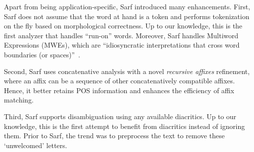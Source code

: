\documentclass[11pt]{article}
\newcommand{\noVocRL}[1]{\transtrue\novocalize\RL{#1}\vocalize}
\begin{document}
Apart from being application-specific, 
Sarf %
introduced 
many enhancements. %
First,
Sarf does not assume that the word at hand is a token and
performs tokenization on the fly based on morphological correctness.
Up to our knowledge, this is the first %
analyzer that 
handles %
``run-on'' words. 
%
Moreover,
Sarf 
handles 
Multiword Expressions (MWEs),
which are 
``idiosyncratic interpretations
that cross word boundaries (or spaces)''~\cite{MWE}. 

Second, 
Sarf uses concatenative analysis with a novel %
{\em recursive affixes} refinement,
where an affix can be a sequence of other concatenatively compatible affixes.
Hence, it better retains
POS information  
and enhances the 
efficiency of affix matching. 

Third, Sarf supports disambiguation using 
any available diacritics.
Up to our knowledge, this is the first attempt to benefit from
diacritics instead of ignoring them. 
Prior to Sarf, the trend was to preprocess 
the text to remove  
these %
`unwelcomed' letters. 
\end{document}
